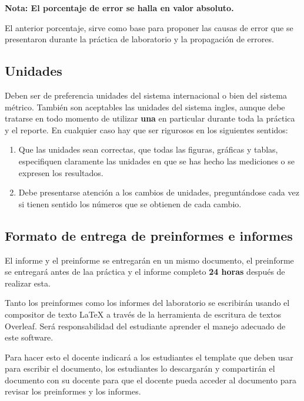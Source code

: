 \documentclass[a4paper]{article}
\begin{document}
\textbf{Nota: El porcentaje de error se halla en valor absoluto.}

El anterior porcentaje, sirve como base para proponer las causas de error que se presentaron durante la práctica de laboratorio y la propagación de errores.

\subsection{Unidades}
Deben ser de preferencia unidades del sistema internacional o bien del sistema métrico. También son aceptables las unidades del sistema ingles, aunque debe tratarse en todo momento de utilizar \textbf{una} en particular durante toda la práctica y el reporte. En cualquier caso hay que ser rigurosos en los siguientes sentidos:

\begin{enumerate}
\item Que las unidades sean correctas, que todas las figuras, gráficas y tablas, especifiquen claramente las unidades en que se has hecho las mediciones o se expresen los resultados.
\item Debe presentarse atención a los cambios de unidades, preguntándose cada vez si tienen sentido los números que se obtienen de cada cambio.
\end{enumerate}

\subsection{Formato de entrega de preinformes e informes}
El informe y el preinforme se entregarán en un mismo documento, el preinforme se entregará antes de laa práctica y el informe completo \textbf{24 horas} después de realizar esta.

Tanto los preinformes como los informes del laboratorio se escribirán usando el compositor de texto \LaTeX\; a través de la herramienta de escritura de textos Overleaf. Será responsabilidad del estudiante aprender el manejo adecuado de este software.

Para hacer esto el docente indicará a los estudiantes el template que deben usar para escribir el documento, los estudiantes lo descargarán y compartirán el documento con su docente para que el docente pueda acceder al documento para revisar los preinformes y los informes.
\end{document}
